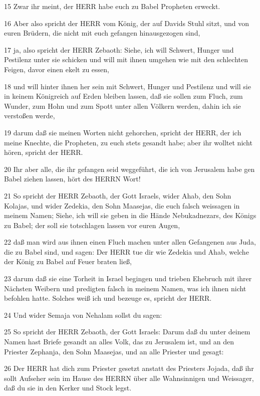 \par 15 Zwar ihr meint, der HERR habe euch zu Babel Propheten erweckt.
\par 16 Aber also spricht der HERR vom König, der auf Davids Stuhl sitzt, und von euren Brüdern, die nicht mit euch gefangen hinausgezogen sind,
\par 17 ja, also spricht der HERR Zebaoth: Siehe, ich will Schwert, Hunger und Pestilenz unter sie schicken und will mit ihnen umgehen wie mit den schlechten Feigen, davor einen ekelt zu essen,
\par 18 und will hinter ihnen her sein mit Schwert, Hunger und Pestilenz und will sie in keinem Königreich auf Erden bleiben lassen, daß sie sollen zum Fluch, zum Wunder, zum Hohn und zum Spott unter allen Völkern werden, dahin ich sie verstoßen werde,
\par 19 darum daß sie meinen Worten nicht gehorchen, spricht der HERR, der ich meine Knechte, die Propheten, zu euch stets gesandt habe; aber ihr wolltet nicht hören, spricht der HERR.
\par 20 Ihr aber alle, die ihr gefangen seid weggeführt, die ich von Jerusalem habe gen Babel ziehen lassen, hört des HERRN Wort!
\par 21 So spricht der HERR Zebaoth, der Gott Israels, wider Ahab, den Sohn Kolajas, und wider Zedekia, den Sohn Maasejas, die euch falsch weissagen in meinem Namen; Siehe, ich will sie geben in die Hände Nebukadnezars, des Königs zu Babel; der soll sie totschlagen lassen vor euren Augen,
\par 22 daß man wird aus ihnen einen Fluch machen unter allen Gefangenen aus Juda, die zu Babel sind, und sagen: Der HERR tue dir wie Zedekia und Ahab, welche der König zu Babel auf Feuer braten ließ,
\par 23 darum daß sie eine Torheit in Israel begingen und trieben Ehebruch mit ihrer Nächsten Weibern und predigten falsch in meinem Namen, was ich ihnen nicht befohlen hatte. Solches weiß ich und bezeuge es, spricht der HERR.
\par 24 Und wider Semaja von Nehalam sollst du sagen:
\par 25 So spricht der HERR Zebaoth, der Gott Israels: Darum daß du unter deinem Namen hast Briefe gesandt an alles Volk, das zu Jerusalem ist, und an den Priester Zephanja, den Sohn Maasejas, und an alle Priester und gesagt:
\par 26 Der HERR hat dich zum Priester gesetzt anstatt des Priesters Jojada, daß ihr sollt Aufseher sein im Hause des HERRN über alle Wahnsinnigen und Weissager, daß du sie in den Kerker und Stock legst.
